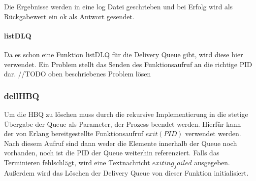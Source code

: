 Die Ergebnisse werden in eine log Datei geschrieben und bei Erfolg wird als Rückgabewert ein ok als Antwort gesendet.

\paragraph{listDLQ}
Da es schon eine Funktion listDLQ für die Delivery Queue gibt, wird diese hier verwendet. Ein Problem stellt das Senden des Funktionsaufruf an die richtige PID dar. 
//TODO oben beschriebenes Problem lösen

\subsubsection{dellHBQ}

Um die HBQ zu löschen muss durch die rekursive Implementierung in die stetige Übergabe der Queue als Parameter, der Prozess beendet werden. Hierfür kann der von Erlang bereitgestellte Funktionsaufruf $exit(PID)$ verwendet werden. Nach diesem Aufruf sind dann weder die Elemente innerhalb der Queue noch vorhanden, noch ist die PID der Queue weiterhin referenziert. Falls das Terminieren fehlschlägt, wird eine Textnachricht $exiting_failed$ ausgegeben. 
Außerdem wird das Löschen der Delivery Queue von dieser Funktion initialisiert. 